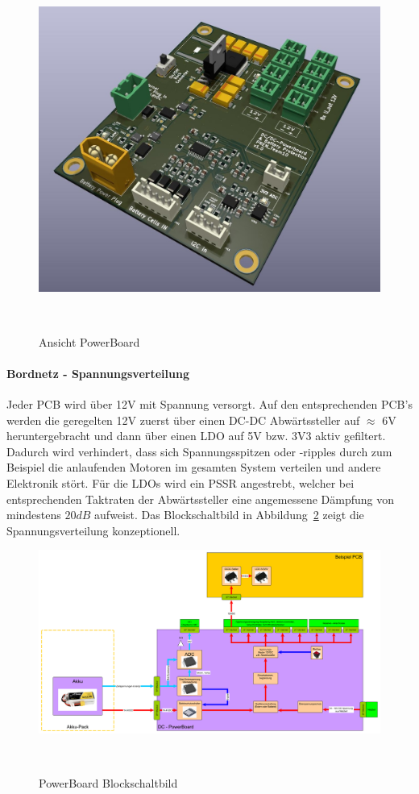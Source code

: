 \documentclass[main.tex]{subfiles} %
\begin{document}
\begin{figure}[H]
    \centering
    \includegraphics[width = 0.75\linewidth]{fig_Bordnetz/PowerDistributionBoard.jpg}
    \caption{Ansicht PowerBoard}~\label{PowerBoard_Ansicht}
\end{figure}

\paragraph{Bordnetz - Spannungsverteilung}
Jeder PCB wird über 12V mit Spannung versorgt. Auf den entsprechenden PCB's
werden die geregelten 12V zuerst über einen DC-DC Abwärtssteller auf $\approx$
6V heruntergebracht und dann über einen LDO auf 5V bzw. 3V3 aktiv gefiltert.
Dadurch wird verhindert, dass sich Spannungsspitzen oder -ripples durch zum
Beispiel die anlaufenden Motoren im gesamten System verteilen und andere
Elektronik stört. Für die LDOs wird ein PSSR angestrebt, welcher bei
entsprechenden Taktraten der Abwärtssteller eine angemessene Dämpfung von
mindestens $20dB$ aufweist. Das Blockschaltbild in
Abbildung~\ref{PowerBoard_Blockschaltbild} zeigt die Spannungsverteilung
konzeptionell.

\begin{figure}[H]
    \centering
    \includegraphics[width = 1\linewidth]{fig_Bordnetz/PowerBoard-Blockschaltbild.pdf}
    \caption{PowerBoard Blockschaltbild}~\label{PowerBoard_Blockschaltbild}
\end{figure}
\end{document}
